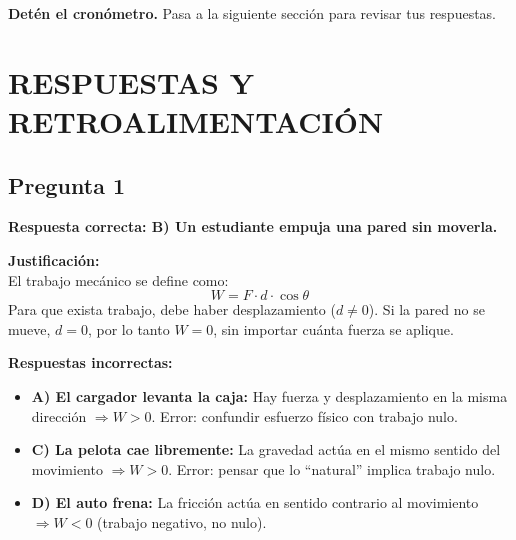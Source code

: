 \vspace{1cm}

\begin{tcolorbox}[colback=amarillonota, colframe=orange, boxrule=0pt, leftrule=3pt]
\textbf{Detén el cronómetro.} Pasa a la siguiente sección para revisar tus respuestas.
\end{tcolorbox}

\newpage
\onecolumn
\section{RESPUESTAS Y RETROALIMENTACIÓN}

\begin{respuestabox}
\subsection{Pregunta 1}
\textcolor{verdecorrecto}{\textbf{Respuesta correcta: B) Un estudiante empuja una pared sin moverla.}}

\textbf{Justificación:}\\
El trabajo mecánico se define como:
$$W = F \cdot d \cdot \cos\theta$$
Para que exista trabajo, debe haber desplazamiento ($d \neq 0$). Si la pared no se mueve, $d = 0$, por lo tanto $W = 0$, sin importar cuánta fuerza se aplique.

\textbf{Respuestas incorrectas:}
\begin{itemize}
    \item \textbf{A) El cargador levanta la caja:} Hay fuerza y desplazamiento en la misma dirección $\Rightarrow W > 0$. Error: confundir esfuerzo físico con trabajo nulo.
    \item \textbf{C) La pelota cae libremente:} La gravedad actúa en el mismo sentido del movimiento $\Rightarrow W > 0$. Error: pensar que lo ``natural'' implica trabajo nulo.
    \item \textbf{D) El auto frena:} La fricción actúa en sentido contrario al movimiento $\Rightarrow W < 0$ (trabajo negativo, no nulo).
\end{itemize}
\end{respuestabox}

